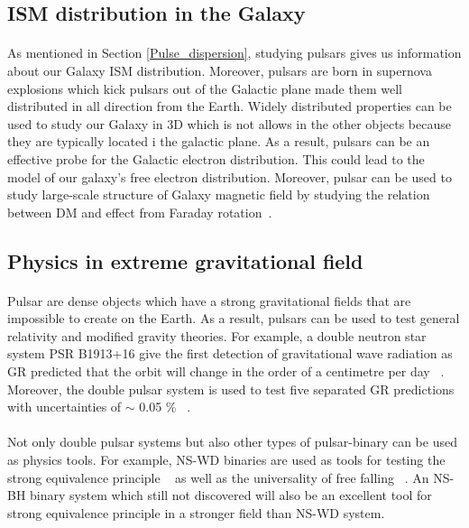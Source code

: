 \documentclass[thesis_msc.tex]{subfiles}
\begin{document}
    \subsection{ISM distribution in the Galaxy}
    \paragraph{} As mentioned in Section \ref{Pulse_dispersion}, studying pulsars gives us information about our Galaxy ISM distribution. Moreover, pulsars are born in supernova explosions which kick pulsars out of the Galactic plane made them well distributed in all direction from the Earth. Widely distributed properties can be used to study our Galaxy in 3D which is not allows in the other objects because they are typically located i the galactic plane.  As a result, pulsars can be an effective probe for the Galactic electron distribution. This could lead to the model of our galaxy's free electron distribution. Moreover, pulsar can be used to study large-scale structure of Galaxy magnetic field by studying the relation between DM and effect from Faraday rotation~\citep{doi:10.1111/j.1365-2966.2008.13188.x}. 
    
    \subsection{Physics in extreme gravitational field}
    \paragraph{} Pulsar are dense objects which have a strong gravitational fields that are impossible to create on the Earth. As a result, pulsars can be used to test general relativity and modified gravity theories. For example, a double neutron star system PSR B1913+16 give the first detection of gravitational wave radiation as GR predicted that the orbit will change in the order of a centimetre per day ~\citep{weisberg2004relativistic}. Moreover, the double pulsar system is used to test five separated GR predictions with uncertainties of $\sim$ 0.05  \%  ~\citep{kramer2006tests}.  
    \paragraph{} Not only double pulsar systems but also other types of pulsar-binary can be used as physics tools. For example, NS-WD binaries are used as tools for testing the strong equivalence principle ~\citep{zhu2018tests} as well as the universality of free falling ~\citep{PhysRevLett.120.241104}. An NS-BH binary system which still not discovered will also be an excellent tool for strong equivalence principle in a stronger field than NS-WD system. 
        
\end{document}
